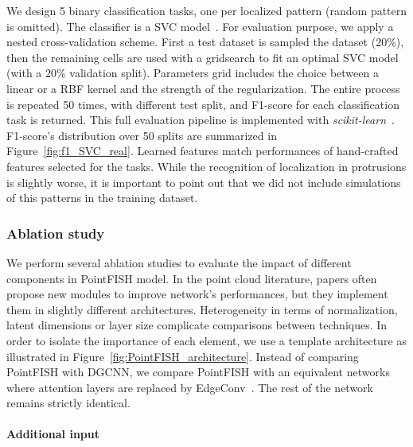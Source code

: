 We design 5 binary classification tasks, one per localized pattern (random pattern is omitted).
The classifier is a SVC model~\cite{chang2011libsvm}.
For evaluation purpose, we apply a nested cross-validation scheme.
First a test dataset is sampled the dataset (20\%), then the remaining cells are used with a gridsearch to fit an optimal SVC model (with a 20\% validation split).
Parameters grid includes the choice between a linear or a RBF kernel and the strength of the regularization.
The entire process is repeated 50 times, with different test split, and F1-score for each classification task is returned.
This full evaluation pipeline is implemented with \emph{scikit-learn}~\cite{scikit-learn}.
F1-score's distribution over 50 splits are summarized in Figure~\ref{fig:f1_SVC_real}.
Learned features match performances of hand-crafted features selected for the tasks.
While the recognition of localization in protrusions is slightly worse, it is important to point out that we did not include simulations of this patterns in the training dataset.

\subsubsection{Ablation study}

We perform several ablation studies to evaluate the impact of different components in PointFISH model.
In the point cloud literature, papers often propose new modules to improve network's performances, but they implement them in slightly different architectures.
Heterogeneity in terms of normalization, latent dimensions or layer size complicate comparisons between techniques.
In order to isolate the importance of each element, we use a template architecture as illustrated in Figure~\ref{fig:PointFISH_architecture}.
Instead of comparing PointFISH with DGCNN, we compare PointFISH with an equivalent networks where attention layers are replaced by EdgeConv~\cite{Wang_2019}.
The rest of the network remains strictly identical.

\paragraph{Additional input}


